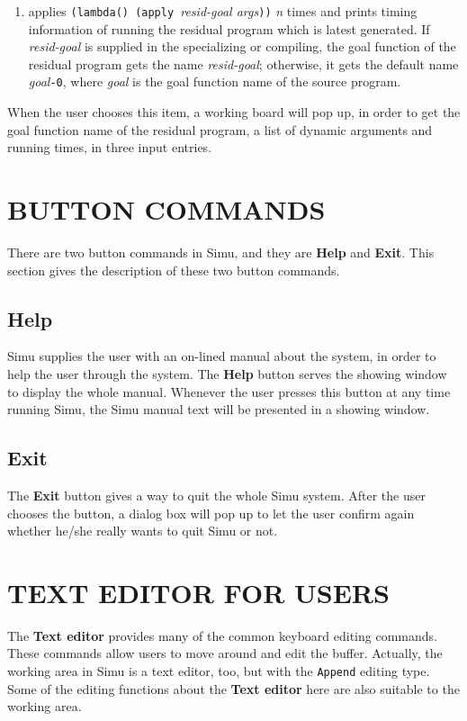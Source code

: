 \begin{sloppypar}
\begin{enumerate}
\item applies {\tt (lambda() (apply }{\it resid-goal args}{\tt ))} {\it n}
   times and prints timing information of running the residual program
   which is latest generated.  If {\it resid-goal} is supplied in the
   specializing or compiling, the goal function of the residual
   program gets the name {\it resid-goal}; otherwise, it gets the
   default name {\it goal}{\tt -0}, where {\it goal} is the goal
   function name of the source program.
\end{enumerate}
\medskip
\par
   When the user chooses this item, a working board will pop up, in
order to get the goal function name of the residual program, a list of
dynamic arguments and running times, in three input entries.


\section{BUTTON COMMANDS}

There are two button commands in Simu, and they are {\bf Help} and
{\bf Exit}. This section gives the description of these two button
commands.

\subsection{Help}

Simu supplies the user with an on-lined manual about the system, in
order to help the user through the system. The {\bf Help} button
serves the showing window to display the whole manual.  Whenever the
user presses this button at any time running Simu, the Simu manual
text will be presented in a showing window.

\subsection{Exit}

The {\bf Exit} button gives a way to quit the whole Simu system. After
the user chooses the button, a dialog box will pop up to let the user
confirm again whether he/she really wants to quit Simu or not.



\section{TEXT EDITOR FOR USERS}


The {\bf Text editor} \cite{Peterson:91} provides many of the common
keyboard editing commands. These commands allow users to move around
and edit the buffer. Actually, the working area in Simu is a text
editor, too, but with the {\tt Append} editing type. Some of the
editing functions about the {\bf Text editor} here are also suitable
to the working area.


\end{sloppypar}
